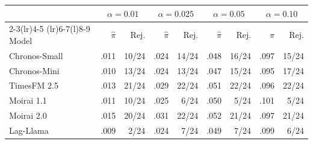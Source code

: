 \begin{tabular}{@{}l rr rr rr rr@{}}
\toprule
& \multicolumn{2}{c}{$\alpha=0.01$}
& \multicolumn{2}{c}{$\alpha=0.025$}
& \multicolumn{2}{c}{$\alpha=0.05$}
& \multicolumn{2}{c}{$\alpha=0.10$} \\
\cmidrule(lr){2-3}\cmidrule(lr){4-5}
\cmidrule(lr){6-7}\cmidrule(l){8-9}
Model & $\hat\pi$ & Rej.
& $\hat\pi$ & Rej.
& $\hat\pi$ & Rej.
& $\hat\pi$ & Rej. \\
\midrule
Chronos-Small & .011 & 10/24
& .024 & 14/24
& .048 & 16/24
& .097 & 15/24 \\
Chronos-Mini & .010 & 13/24
& .024 & 13/24
& .047 & 15/24
& .095 & 17/24 \\
TimesFM 2.5 & .013 & 21/24
& .029 & 22/24
& .051 & 22/24
& .096 & 22/24 \\
Moirai 1.1 & .011 & 10/24
& .025 & 6/24
& .050 & 5/24
& .101 & 5/24 \\
Moirai 2.0 & .015 & 20/24
& .031 & 22/24
& .052 & 21/24
& .097 & 21/24 \\
Lag-Llama & .009 & 2/24
& .024 & 7/24
& .049 & 7/24
& .099 & 6/24 \\
\bottomrule
\end{tabular}

